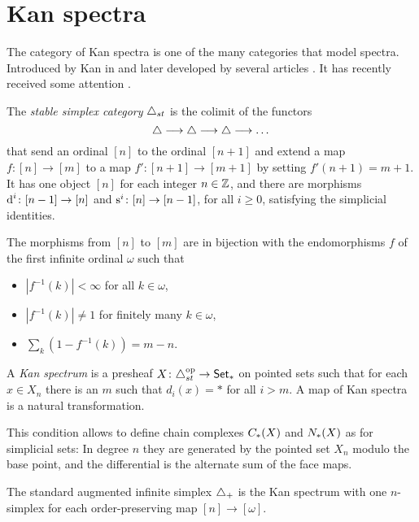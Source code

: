 
\section{Kan spectra}\label{s:9Kanspectra}

The category of Kan spectra is one of the many categories that model spectra. Introduced by Kan in \cite{Kan1963} and later developed by several articles \cite{burghelea_kanspectraI1967, burghelea_kanspectraII_1968, burghelea_kanspectraIII1969,Brown1973}. It has recently received some attention \cite{Stephan2015, CKP2023}.

\begin{definition}
	The \emph{stable simplex category} $\triangle_{st}$ is the colimit of the functors
	\[
	\triangle \longrightarrow \triangle \longrightarrow \triangle \longrightarrow \dots
	\]
	that send an ordinal $[n]$ to the ordinal $[n+1]$ and extend a map $f \colon [n] \to [m]$ to a map $f' \colon [n+1] \to [m+1]$ by setting $f'(n+1) = m+1$. It has one object $[n]$ for each integer $n\in \mathbb{Z}$, and there are morphisms $\operatorname{d}^i \colon [n-1] \to [n]$ and $\operatorname{s}^i \colon [n] \to [n-1]$, for all $i \geq 0$, satisfying the simplicial identities.
\end{definition}

The morphisms from $[n]$ to $[m]$ are in bijection with the endomorphisms $f$ of the first infinite ordinal $\omega$ such that
\begin{itemize}
	\item $|f^{-1}(k)|<\infty$ for all $k\in \omega$,
	\item $|f^{-1}(k)|\neq 1$ for finitely many $k\in \omega$,
	\item $\sum_k (1-f^{-1}(k)) = m-n$.
\end{itemize}

\begin{definition}
	A \emph{Kan spectrum} is a presheaf $X \colon \triangle_{st}^{{\mathrm{op}}} \to \mathsf{Set}_*$ on pointed sets such that for each $x\in X_n$ there is an $m$ such that $d_i(x) = *$ for all $i>m$. A map of Kan spectra is a natural transformation.
\end{definition}

This condition allows to define chain complexes $C_{*}(X)$ and $N_{*}(X)$ as for simplicial sets: In degree $n$ they are generated by the pointed set $X_n$ modulo the base point, and the differential is the alternate sum of the face maps.

The standard augmented infinite simplex $\triangle_{+}$ is the Kan spectrum with one $n$-simplex for each order-preserving map $[n] \to [\omega]$.

